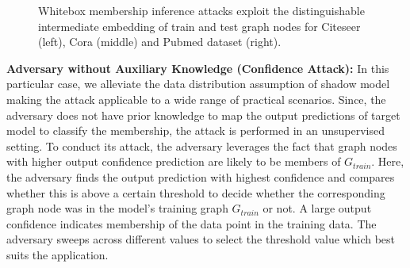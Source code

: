 \begin{figure}[!htb]
\centering
{}
\caption{Whitebox membership inference attacks exploit the distinguishable intermediate embedding of train and test graph nodes for Citeseer (left), Cora (middle) and Pubmed dataset (right).}
\label{embedding}
\end{figure}



\noindent\textbf{Adversary without Auxiliary Knowledge (Confidence Attack):} In this particular case, we alleviate the data distribution assumption of shadow model making the attack applicable to a wide range of practical scenarios.
Since, the adversary does not have prior knowledge to map the output predictions of target model to classify the membership, the attack is performed in an unsupervised setting. %
To conduct its attack, the adversary leverages the fact that graph nodes with higher output confidence prediction are likely to be members of $G_{train}$.
Here, the adversary finds the output prediction with highest confidence and compares whether this is above a certain threshold to decide whether the corresponding graph node was in the model's training graph $G_{train}$ or not.
A large output confidence indicates membership of the data point in the training data.
The adversary sweeps across different values to select the threshold value which best suits the application.\\





